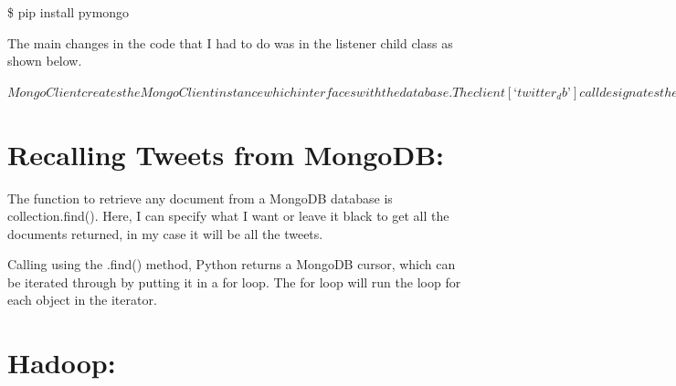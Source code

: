\$ pip install pymongo

The main changes in the code that I had to do was in the listener child class as shown below.

$MongoClient creates the MongoClient instance which interfaces with the database. The client[‘twitter_db’] call designates the database that is going to be used, and the db[‘twitter_collection’] call selects the collection where the documents will be stored. The json.loads() call converts the string returned from the Twitter API into a json object in Python. Finally, the collection.insert() call inserts the json object into the MongoDB database. From this rather simple change to the Python stream listener all the tweets can be saved into a MongoDB database.
$
\section{Recalling Tweets from MongoDB:}

The function to retrieve any document from a MongoDB database is collection.find(). Here, I can specify what I want or leave it black to get all the documents returned, in my case it will be all the tweets.

Calling using the .find() method, Python returns a MongoDB cursor, which can be iterated through by putting it in a for loop. The for loop will run the loop for each object in the iterator. 

\section{Hadoop:}